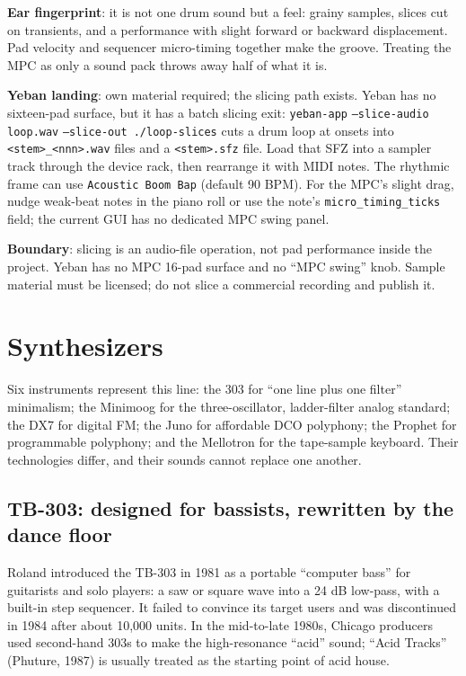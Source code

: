 \textbf{Ear fingerprint}: it is not one drum sound but a feel: grainy
samples, slices cut on transients, and a performance with slight forward or
backward displacement. Pad velocity and sequencer micro-timing together make
the groove. Treating the MPC as only a sound pack throws away half of what it
is.

\begin{sloppypar}
\textbf{Yeban landing}: own material required; the slicing path exists.
Yeban has no sixteen-pad surface, but it has a batch slicing exit:
\texttt{yeban-app} \texttt{--slice-audio loop.wav} \texttt{--slice-out ./loop-slices} cuts a
drum loop at onsets into \texttt{<stem>\_<nnn>.wav} files and a
\texttt{<stem>.sfz} file. Load that SFZ into a sampler track through the
device rack, then rearrange it with MIDI notes. The rhythmic frame can use
\texttt{Acoustic Boom Bap} (default 90 BPM). For the MPC's slight drag, nudge
weak-beat notes in the piano roll or use the note's
\texttt{micro\_timing\_ticks} field; the current GUI has no dedicated MPC
swing panel.
\end{sloppypar}

\textbf{Boundary}: slicing is an audio-file operation, not pad performance
inside the project. Yeban has no MPC 16-pad surface and no ``MPC swing''
knob. Sample material must be licensed; do not slice a commercial recording
and publish it.

\section{Synthesizers}
\label{sec:iconic-synths}

Six instruments represent this line: the 303 for ``one line plus one filter''
minimalism; the Minimoog for the three-oscillator, ladder-filter analog
standard; the DX7 for digital FM; the Juno for affordable DCO polyphony; the
Prophet for programmable polyphony; and the Mellotron for the tape-sample
keyboard. Their technologies differ, and their sounds cannot replace one
another.

\subsection{TB-303: designed for bassists, rewritten by the dance floor}
\label{sec:iconic-303}

Roland introduced the TB-303 in 1981 as a portable ``computer bass'' for
guitarists and solo players: a saw or square wave into a 24 dB low-pass, with
a built-in step sequencer. It failed to convince its target users and was
discontinued in 1984 after about 10,000 units. In the mid-to-late 1980s,
Chicago producers used second-hand 303s to make the high-resonance ``acid''
sound; ``Acid Tracks'' (Phuture, 1987) is usually treated as the starting
point of acid house.

